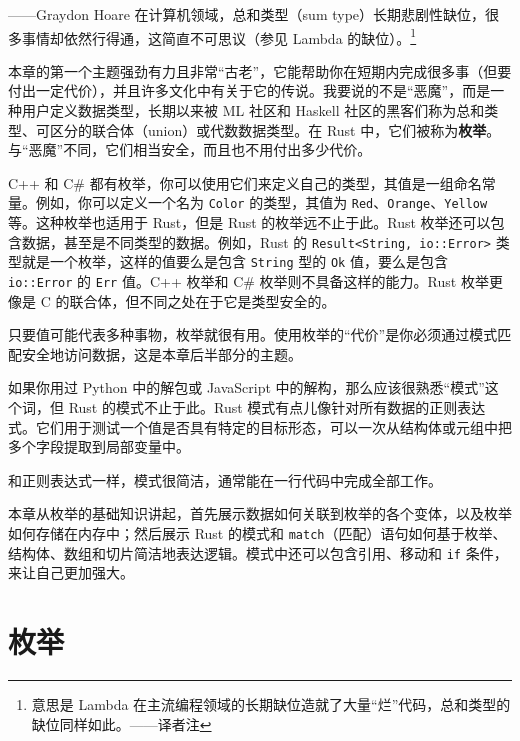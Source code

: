 
\begin{myEpigraph}{——Graydon Hoare}
在计算机领域，总和类型（sum type）长期悲剧性缺位，很多事情却依然行得通，这简直不可思议（参见 Lambda 的缺位）。\footnote{意思是 Lambda 在主流编程领域的长期缺位造就了大量“烂”代码，总和类型的缺位同样如此。——译者注}
\end{myEpigraph}

本章的第一个主题强劲有力且非常“古老”，它能帮助你在短期内完成很多事（但要付出一定代价），并且许多文化中有关于它的传说。我要说的不是“恶魔”，而是一种用户定义数据类型，长期以来被 ML 社区和 Haskell 社区的黑客们称为总和类型、可区分的联合体（union）或代数数据类型。在 Rust 中，它们被称为\textbf{枚举}。与“恶魔”不同，它们相当安全，而且也不用付出多少代价。

C++ 和 C\# 都有枚举，你可以使用它们来定义自己的类型，其值是一组命名常量。例如，你可以定义一个名为 \texttt{Color} 的类型，其值为 \texttt{Red}、\texttt{Orange}、\texttt{Yellow} 等。这种枚举也适用于 Rust，但是 Rust 的枚举远不止于此。Rust 枚举还可以包含数据，甚至是不同类型的数据。例如，Rust 的 \texttt{Result<String, io::Error>} 类型就是一个枚举，这样的值要么是包含 \texttt{String} 型的 \texttt{Ok} 值，要么是包含 \texttt{io::Error} 的 \texttt{Err} 值。C++ 枚举和 C\# 枚举则不具备这样的能力。Rust 枚举更像是 C 的联合体，但不同之处在于它是类型安全的。

只要值可能代表多种事物，枚举就很有用。使用枚举的“代价”是你必须通过模式匹配安全地访问数据，这是本章后半部分的主题。

如果你用过 Python 中的解包或 JavaScript 中的解构，那么应该很熟悉“模式”这个词，但 Rust 的模式不止于此。Rust 模式有点儿像针对所有数据的正则表达式。它们用于测试一个值是否具有特定的目标形态，可以一次从结构体或元组中把多个字段提取到局部变量中。

和正则表达式一样，模式很简洁，通常能在一行代码中完成全部工作。

本章从枚举的基础知识讲起，首先展示数据如何关联到枚举的各个变体，以及枚举如何存储在内存中；然后展示 Rust 的模式和 \texttt{match}（匹配）语句如何基于枚举、结构体、数组和切片简洁地表达逻辑。模式中还可以包含引用、移动和 \texttt{if} 条件，来让自己更加强大。

\section{枚举}

